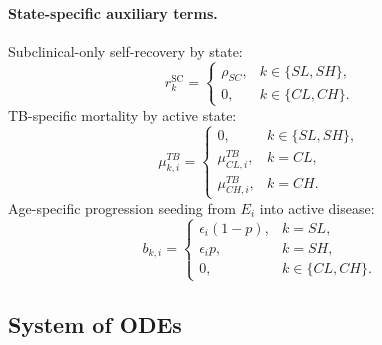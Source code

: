 \documentclass[11pt]{article}
\begin{document}
\paragraph{State-specific auxiliary terms.}
Subclinical-only self-recovery by state:
\[
r^{\mathrm{SC}}_k =
\begin{cases}
\rho_{SC}, & k\in\{SL,SH\},\\
0, & k\in\{CL,CH\}.
\end{cases}
\]
TB-specific mortality by active state:
\[
\mu^{TB}_{k,i} =
\begin{cases}
0, & k\in\{SL,SH\},\\
\mu^{TB}_{CL,i}, & k=CL,\\
\mu^{TB}_{CH,i}, & k=CH.
\end{cases}
\]
Age-specific progression seeding from \(E_i\) into active disease:
\[
b_{k,i} =
\begin{cases}
\epsilon_i(1-p), & k=SL,\\
\epsilon_i p, & k=SH,\\
0, & k\in\{CL,CH\}.
\end{cases}
\]

\begingroup
\footnotesize
\setlength{\abovedisplayskip}{6pt}
\setlength{\belowdisplayskip}{6pt}
\setlength{\jot}{3pt}

\subsection{System of ODEs}
\end{document}
